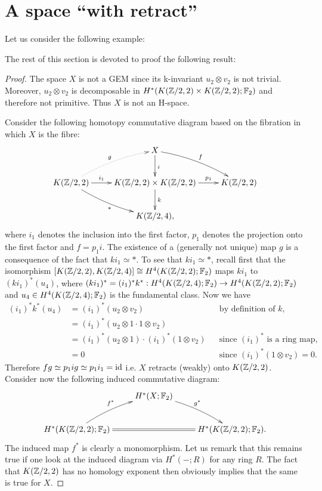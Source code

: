 \section{A space ``with retract''}\label{section:space_with_retract}

Let us consider the following example:

\begin{exmp_retract}

\end{exmp_retract}

The rest of this section is devoted to proof the following result:

\begin{thm_retract}

\end{thm_retract}

\begin{proof}
The space $X$ is not a GEM since its k-invariant $u_2\otimes v_2$ is not trivial. Moreover, $u_2\otimes v_2$ is decomposable in $H^*(K(\mathbb{Z}/2,2)\times K(\mathbb{Z}/2,2);\mathbb{F}_2)$ and therefore not primitive. Thus $X$ is not an H-space. 

Consider the following homotopy commutative diagram based on the fibration in which $X$ is the fibre:
$$\xymatrix{
&X\ar[d]^i\ar@/^/[rd]^f\\
K(\Z/2,2)\ar[r]^-{i_1}\ar@/^/@{.>}[ru]^g\ar@/_/[rd]_{*} &K(\Z/2,2)\times K(\Z/2,2)\ar[r]^-{p_1}\ar[d]^k &K(\Z/2,2)\\
&K(\Z/2,4),
}$$ where $i_1$ denotes the inclusion into the first factor, $p_1$ denotes the projection onto the first factor and $f=p_1i$. The existence of a (generally not unique) map $g$ is a consequence of the fact that $k i_1\simeq*$. To see that $k i_1\simeq*$, recall first that the isomorphism $[K(\mathbb{Z}/2,2),K(\mathbb{Z}/2,4)]\cong H^4(K(\mathbb{Z}/2,2);\mathbb{F}_2)$ maps $ki_1$ to $(ki_1)^*(u_4)$, where $(ki_1)^*=(i_1)^*k^*:H^4(K(\mathbb{Z}/2,4);\mathbb{F}_2)\to H^4(K(\mathbb{Z}/2,2);\mathbb{F}_2)$ and $u_4\in H^4(K(\mathbb{Z}/2,4);\mathbb{F}_2)$ is the fundamental class. Now we have 
\begin{align*}
(i_1)^*k^*(u_4) &=(i_1)^*(u_2\otimes v_2) &&\text{by definition of $k$,}\\
&=(i_1)^*(u_2\otimes1\cdot1\otimes v_2)\\
&=(i_1)^*(u_2\otimes1)\cdot(i_1)^*(1\otimes v_2) &&\text{since $(i_1)^*$ is a ring map,}\\
&=0 &&\text{since $(i_1)^*(1\otimes v_2)=0$.}
\end{align*}
Therefore $fg\simeq p_1ig\simeq p_1i_1=\operatorname{id}$ i.e. $X$ retracts (weakly) onto $K(\mathbb{Z}/2,2)$. Consider now the following induced commutative diagram:
$$\xymatrix{
&H^*(X;\F_2)\ar@/^/[rd]^{g^*}\\
H^*(K(\Z/2,2);\F_2)\ar@/^/[ru]^{f^*}\ar@{=}[rr] &&H^*(K(\Z/2,2);\F_2).
}$$ The induced map $f^*$ is clearly a monomorphism. Let us remark that this remains true if one look at the induced diagram via $H^*(-;R)$ for any ring $R$. The fact that $K(\mathbb{Z}/2,2)$ has no homology exponent then obviously implies that the same is true for $X$.
\end{proof}

\endinput